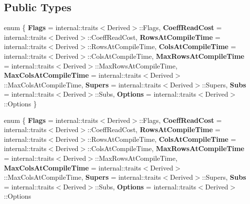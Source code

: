 \subsection*{Public Types}
\begin{DoxyCompactItemize}
\item 
\mbox{\label{class_eigen_1_1internal_1_1_band_matrix_base_a40b8c3db6adf103fdde935a3c80d4c20}} 
enum \{ \newline
{\bfseries Flags} = internal\+:\+:traits$<$Derived$>$\+:\+:Flags, 
{\bfseries Coeff\+Read\+Cost} = internal\+:\+:traits$<$Derived$>$\+:\+:Coeff\+Read\+Cost, 
{\bfseries Rows\+At\+Compile\+Time} = internal\+:\+:traits$<$Derived$>$\+:\+:Rows\+At\+Compile\+Time, 
{\bfseries Cols\+At\+Compile\+Time} = internal\+:\+:traits$<$Derived$>$\+:\+:Cols\+At\+Compile\+Time, 
\newline
{\bfseries Max\+Rows\+At\+Compile\+Time} = internal\+:\+:traits$<$Derived$>$\+:\+:Max\+Rows\+At\+Compile\+Time, 
{\bfseries Max\+Cols\+At\+Compile\+Time} = internal\+:\+:traits$<$Derived$>$\+:\+:Max\+Cols\+At\+Compile\+Time, 
{\bfseries Supers} = internal\+:\+:traits$<$Derived$>$\+:\+:Supers, 
{\bfseries Subs} = internal\+:\+:traits$<$Derived$>$\+:\+:Subs, 
\newline
{\bfseries Options} = internal\+:\+:traits$<$Derived$>$\+:\+:Options
 \}
\item 
\mbox{\label{class_eigen_1_1internal_1_1_band_matrix_base_a04501d548c5ed87a8aca26f59fa9f322}} 
enum \{ \newline
{\bfseries Flags} = internal\+:\+:traits$<$Derived$>$\+:\+:Flags, 
{\bfseries Coeff\+Read\+Cost} = internal\+:\+:traits$<$Derived$>$\+:\+:Coeff\+Read\+Cost, 
{\bfseries Rows\+At\+Compile\+Time} = internal\+:\+:traits$<$Derived$>$\+:\+:Rows\+At\+Compile\+Time, 
{\bfseries Cols\+At\+Compile\+Time} = internal\+:\+:traits$<$Derived$>$\+:\+:Cols\+At\+Compile\+Time, 
\newline
{\bfseries Max\+Rows\+At\+Compile\+Time} = internal\+:\+:traits$<$Derived$>$\+:\+:Max\+Rows\+At\+Compile\+Time, 
{\bfseries Max\+Cols\+At\+Compile\+Time} = internal\+:\+:traits$<$Derived$>$\+:\+:Max\+Cols\+At\+Compile\+Time, 
{\bfseries Supers} = internal\+:\+:traits$<$Derived$>$\+:\+:Supers, 
{\bfseries Subs} = internal\+:\+:traits$<$Derived$>$\+:\+:Subs, 
\newline
{\bfseries Options} = internal\+:\+:traits$<$Derived$>$\+:\+:Options

\end{DoxyCompactItemize}
